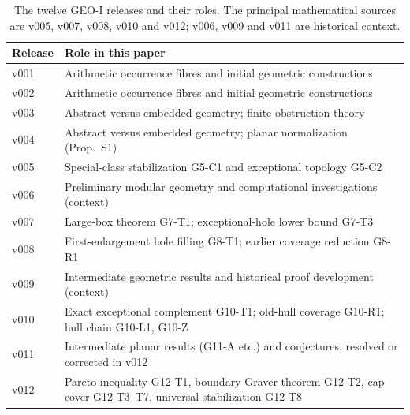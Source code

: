 \begin{table}[ht]
\centering\small
\begin{tabular}{@{}lp{12.2cm}@{}}
\toprule Release & Role in this paper\\\midrule
v001~\cite{GEOIv001} & Arithmetic occurrence fibres and initial geometric constructions\\
v002~\cite{GEOIv002} & Arithmetic occurrence fibres and initial geometric constructions\\
v003~\cite{GEOIv003} & Abstract versus embedded geometry; finite obstruction theory\\
v004~\cite{GEOIv004} & Abstract versus embedded geometry; planar normalization (Prop.~S1)\\
v005~\cite{GEOIv005} & Special-class stabilization G5-C1 and exceptional topology G5-C2\\
v006~\cite{GEOIv006} & Preliminary modular geometry and computational investigations (context)\\
v007~\cite{GEOIv007} & Large-box theorem G7-T1; exceptional-hole lower bound G7-T3\\
v008~\cite{GEOIv008} & First-enlargement hole filling G8-T1; earlier coverage reduction G8-R1\\
v009~\cite{GEOIv009} & Intermediate geometric results and historical proof development (context)\\
v010~\cite{GEOIv010} & Exact exceptional complement G10-T1; old-hull coverage G10-R1; hull chain G10-L1, G10-Z\\
v011~\cite{GEOIv011} & Intermediate planar results (G11-A etc.) and conjectures, resolved or corrected in v012\\
v012~\cite{GEOIv012} & Pareto inequality G12-T1, boundary Graver theorem G12-T2, cap cover G12-T3--T7, universal stabilization G12-T8\\
\bottomrule
\end{tabular}
\caption{The twelve GEO-I releases and their roles. The principal mathematical sources are v005, v007, v008, v010 and v012; v006, v009 and v011 are historical context.}\label{tab:geoi-roles}
\end{table}

